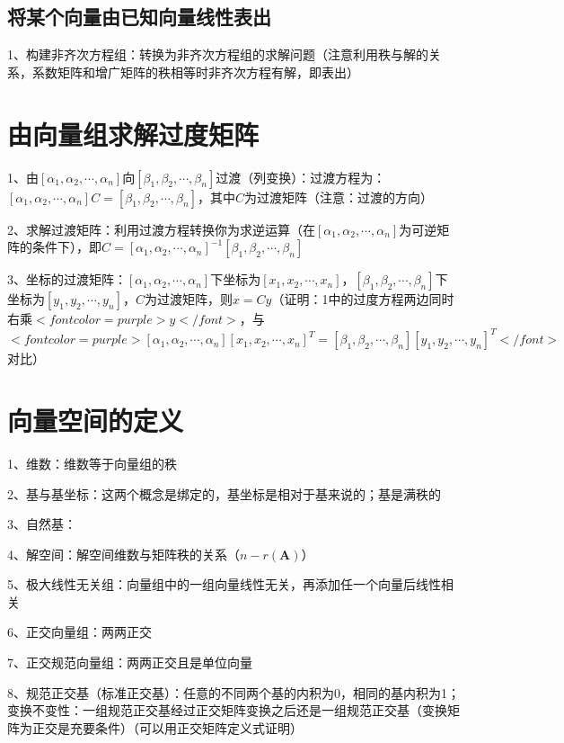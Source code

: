 \subsection{将某个向量由已知向量线性表出}

1、构建非齐次方程组：转换为非齐次方程组的求解问题（注意利用秩与解的关系，系数矩阵和增广矩阵的秩相等时非齐次方程有解，即表出）

\section{由向量组求解过度矩阵}

1、由$ [\alpha_1,\alpha_2,\cdots,\alpha_n] $向$ [\beta_1,\beta_2,\cdots,\beta_n] $过渡（列变换）：过渡方程为：$ [\alpha_1,\alpha_2,\cdots,\alpha_n]C=[\beta_1,\beta_2,\cdots,\beta_n] $，其中$ C $为过渡矩阵（注意：过渡的方向）

2、求解过渡矩阵：利用过渡方程转换你为求逆运算（在$ [\alpha_1,\alpha_2,\cdots,\alpha_n] $为可逆矩阵的条件下），即$ C=[\alpha_1,\alpha_2,\cdots,\alpha_n]^{-1}[\beta_1,\beta_2,\cdots,\beta_n] $

3、坐标的过渡矩阵：$ [\alpha_1,\alpha_2,\cdots,\alpha_n] $下坐标为$ [x_1,x_2,\cdots,x_n] $，$ [\beta_1,\beta_2,\cdots,\beta_n] $下坐标为$ [y_1,y_2,\cdots,y_n] $，$ C $为过渡矩阵，则$ x=Cy $（证明：1中的过度方程两边同时右乘$ <font color=purple>y</font> $，与$ <font color=purple>[\alpha_1,\alpha_2,\cdots,\alpha_n][x_1,x_2,\cdots,x_n]^T=[\beta_1,\beta_2,\cdots,\beta_n][y_1,y_2,\cdots,y_n]^T</font> $对比）

\section{向量空间的定义}

1、维数：维数等于向量组的秩

2、基与基坐标：这两个概念是绑定的，基坐标是相对于基来说的；基是满秩的

3、自然基：

4、解空间：解空间维数与矩阵秩的关系（$ n-r(\boldsymbol{A}) $）

5、极大线性无关组：向量组中的一组向量线性无关，再添加任一个向量后线性相关

6、正交向量组：两两正交

7、正交规范向量组：两两正交且是单位向量

8、规范正交基（标准正交基）：任意的不同两个基的内积为0，相同的基内积为1；变换不变性：一组规范正交基经过正交矩阵变换之后还是一组规范正交基（变换矩阵为正交是充要条件）（可以用正交矩阵定义式证明）


